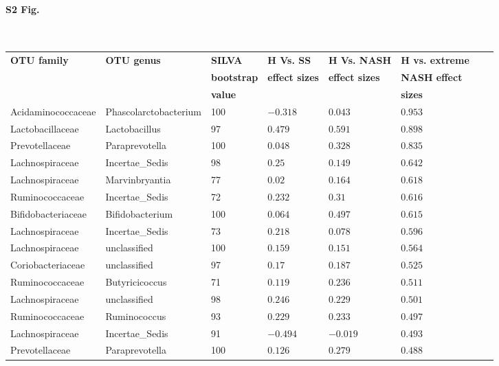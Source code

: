 \begin{table}[!ht]
\paragraph*{S2 Fig.}{\mbox{}}\\
\begin{tiny}
\begin{tabular}{|l|l|l|l|l|l|l|l|}
\hline
\bf{OTU family} & \bf{OTU genus} & \bf{SILVA} &\bf{H Vs. SS} & \bf{H Vs. NASH} & \bf{H vs. extreme} \\
& & \bf{bootstrap} & \bf{effect sizes} & \bf{effect sizes} & \bf{NASH effect} \\
& & \bf{value} & & & \bf{sizes}\\ \hline
Acidaminococcaceae & Phascolarctobacterium & 100 & $-0.318$ & $0.043$ & $0.953$ \\ \hline
Lactobacillaceae & Lactobacillus & 97 & $0.479$ & $0.591$ & $0.898$ \\ \hline
Prevotellaceae & Paraprevotella & 100 & $0.048$ & $0.328$ & $0.835$ \\ \hline
Lachnospiraceae & Incertae_Sedis & 98 & $0.25$ & $0.149$ & $0.642$ \\ \hline
Lachnospiraceae & Marvinbryantia & 77 & $0.02$ & $0.164$ & $0.618$ \\ \hline
Ruminococcaceae & Incertae_Sedis & 72 & $0.232$ & $0.31$ & $0.616$ \\ \hline
Bifidobacteriaceae & Bifidobacterium & 100 & $0.064$ & $0.497$ & $0.615$ \\ \hline
Lachnospiraceae & Incertae_Sedis & 73 & $0.218$ & $0.078$ & $0.596$ \\ \hline
Lachnospiraceae & unclassified & 100 & $0.159$ & $0.151$ & $0.564$ \\ \hline
Coriobacteriaceae & unclassified & 97 & $0.17$ & $0.187$ & $0.525$ \\ \hline
Ruminococcaceae & Butyricicoccus & 71 & $0.119$ & $0.236$ & $0.511$ \\ \hline
Lachnospiraceae & unclassified & 98 & $0.246$ & $0.229$ & $0.501$ \\ \hline
Ruminococcaceae & Ruminococcus & 93 & $0.229$ & $0.233$ & $0.497$ \\ \hline
Lachnospiraceae & Incertae_Sedis & 91 & $-0.494$ & $-0.019$ & $0.493$ \\ \hline
Prevotellaceae & Paraprevotella & 100 & $0.126$ & $0.279$ & $0.488$ \\ \hline

\end{tabular}
\end{tiny}
\end{table}
